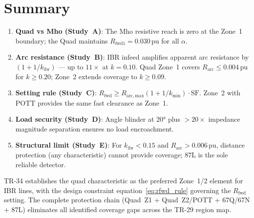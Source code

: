 \documentclass[11pt,a4paper]{article}
\begin{document}
\section{Summary}
\label{sec:summary}

\begin{enumerate}
  \item \textbf{Quad vs Mho (Study~A)}: The Mho resistive reach is zero at the
    Zone~1 boundary; the Quad maintains $R_\mathrm{fwd1}=0.030$\,pu for all $\alpha$.

  \item \textbf{Arc resistance (Study~B)}: IBR infeed amplifies apparent arc
    resistance by $(1+1/k_\mathrm{ibr})$ --- up to $11\times$ at $k=0.10$.
    Quad Zone~1 covers $R_\mathrm{arc}\leq0.004$\,pu for $k\geq0.20$;
    Zone~2 extends coverage to $k\geq0.09$.

  \item \textbf{Setting rule (Study~C)}: $R_\mathrm{fwd}\geq
    R_\mathrm{arc,max}(1+1/k_\mathrm{min})\cdot\mathrm{SF}$.
    Zone~2 with POTT provides the same fast clearance as Zone~1.

  \item \textbf{Load security (Study~D)}: Angle blinder at 20° plus
    $>20\times$ impedance magnitude separation ensures no load encroachment.

  \item \textbf{Structural limit (Study~E)}: For $k_\mathrm{ibr}<0.15$ and
    $R_\mathrm{arc}>0.006$\,pu, distance protection (any characteristic) cannot
    provide coverage; 87L is the sole reliable detector.
\end{enumerate}

\noindent
TR-34 establishes the quad characteristic as the preferred Zone~1/2 element for
IBR lines, with the design constraint equation~\eqref{eq:rfwd_rule} governing the
$R_\mathrm{fwd}$ setting.  The complete protection chain (Quad~Z1 + Quad~Z2/POTT
+ 67Q/67N + 87L) eliminates all identified coverage gaps across the TR-29 region
map.



\end{document}
